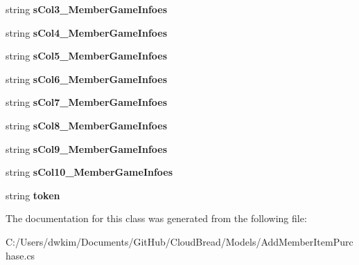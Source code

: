 \begin{DoxyCompactItemize}
\item 
string {\bfseries s\+Col3\+\_\+\+Member\+Game\+Infoes}\hypertarget{a00004_ac98a4df03846965a720864b8cb9a3275}{}\label{a00004_ac98a4df03846965a720864b8cb9a3275}

\item 
string {\bfseries s\+Col4\+\_\+\+Member\+Game\+Infoes}\hypertarget{a00004_a2ff4896e3eab37518ff61752a3e1ac88}{}\label{a00004_a2ff4896e3eab37518ff61752a3e1ac88}

\item 
string {\bfseries s\+Col5\+\_\+\+Member\+Game\+Infoes}\hypertarget{a00004_a6c6d8639b1057ea9a1a7d10e558f1f80}{}\label{a00004_a6c6d8639b1057ea9a1a7d10e558f1f80}

\item 
string {\bfseries s\+Col6\+\_\+\+Member\+Game\+Infoes}\hypertarget{a00004_ac997012dbdf06c07c0cab33f692ddd3f}{}\label{a00004_ac997012dbdf06c07c0cab33f692ddd3f}

\item 
string {\bfseries s\+Col7\+\_\+\+Member\+Game\+Infoes}\hypertarget{a00004_a2bfceb3866a08214cca579a3eba7be94}{}\label{a00004_a2bfceb3866a08214cca579a3eba7be94}

\item 
string {\bfseries s\+Col8\+\_\+\+Member\+Game\+Infoes}\hypertarget{a00004_a64fde976e74106cf5a5fd626b16c4bd3}{}\label{a00004_a64fde976e74106cf5a5fd626b16c4bd3}

\item 
string {\bfseries s\+Col9\+\_\+\+Member\+Game\+Infoes}\hypertarget{a00004_ae743fb3a6f39689af1ee1283aa8aede8}{}\label{a00004_ae743fb3a6f39689af1ee1283aa8aede8}

\item 
string {\bfseries s\+Col10\+\_\+\+Member\+Game\+Infoes}\hypertarget{a00004_a7f503234447e1e9e0d35ce1c4ccf053f}{}\label{a00004_a7f503234447e1e9e0d35ce1c4ccf053f}

\item 
string {\bfseries token}\hypertarget{a00004_aee2c6af94a7a2dd0d4830ec43c654232}{}\label{a00004_aee2c6af94a7a2dd0d4830ec43c654232}

\end{DoxyCompactItemize}


The documentation for this class was generated from the following file\+:\begin{DoxyCompactItemize}
\item 
C\+:/\+Users/dwkim/\+Documents/\+Git\+Hub/\+Cloud\+Bread/\+Models/Add\+Member\+Item\+Purchase.\+cs\end{DoxyCompactItemize}
